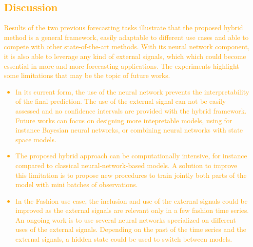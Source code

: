 \documentclass[10pt]{article} %
\begin{document}
\textcolor{orange}{
\subsection{Discussion}
Results of the two previous forecasting tasks illustrate that the proposed hybrid method is a general framework, easily adaptable to different use cases and able to compete with other state-of-the-art methods. With its neural network component, it is also able to leverage any kind of external signals, which which could become essential in more and more forecasting applications. The experiments highlight some limitations that may be the topic of future works.
\begin{itemize}
\item In its current form, the use of the neural network prevents the interpretability of the final prediction. The use of the external signal can not be easily assessed and no confidence intervals are provided with the hybrid framework. Future works can focus on designing more intepretable models, using for instance Bayesian neural networks, or combining neural networks with state space models.
\item The proposed hybrid approach can be computationally intensive, for instance  compared to classical neural-network-based models. A solution to improve this limitation is to propose new  procedures to train jointly both parts of the model with mini batches of observations.
\item In the Fashion use case, the inclusion and use of the external signals could be improved as the external signals are relevant only in a few fashion time series. An ongoing work is to use several neural networks specialized on different uses of the external signals. Depending on the past of the time series and the external signals, a hidden state could be used to switch between models.%
\end{itemize}
}
\end{document}
